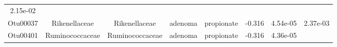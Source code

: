 \documentclass[11pt,]{article}
\begin{document}
\begin{longtable}[]{@{}cccccccc@{}}
\begin{minipage}[t]{0.08\columnwidth}
2.15e-02\strut
\end{minipage}\tabularnewline
\begin{minipage}[t]{0.08\columnwidth}\centering\strut
Otu00037\strut
\end{minipage} & \begin{minipage}[t]{0.15\columnwidth}\centering\strut
Rikenellaceae\strut
\end{minipage} & \begin{minipage}[t]{0.15\columnwidth}\centering\strut
Rikenellaceae\strut
\end{minipage} & \begin{minipage}[t]{0.08\columnwidth}\centering\strut
adenoma\strut
\end{minipage} & \begin{minipage}[t]{0.09\columnwidth}\centering\strut
propionate\strut
\end{minipage} & \begin{minipage}[t]{0.07\columnwidth}\centering\strut
-0.316\strut
\end{minipage} & \begin{minipage}[t]{0.08\columnwidth}\centering\strut
4.54e-05\strut
\end{minipage} & \begin{minipage}[t]{0.08\columnwidth}\centering\strut
2.37e-03\strut
\end{minipage}\tabularnewline
\begin{minipage}[t]{0.08\columnwidth}\centering\strut
Otu00401\strut
\end{minipage} & \begin{minipage}[t]{0.15\columnwidth}\centering\strut
Ruminococcaceae\strut
\end{minipage} & \begin{minipage}[t]{0.15\columnwidth}\centering\strut
Ruminococcaceae\strut
\end{minipage} & \begin{minipage}[t]{0.08\columnwidth}\centering\strut
adenoma\strut
\end{minipage} & \begin{minipage}[t]{0.09\columnwidth}\centering\strut
propionate\strut
\end{minipage} & \begin{minipage}[t]{0.07\columnwidth}\centering\strut
-0.316\strut
\end{minipage} & \begin{minipage}[t]{0.08\columnwidth}\centering\strut
4.36e-05\strut
\end{minipage} & \begin{minipage}[t]{0.08\columnwidth}\centering\strut

\end{minipage}
\end{longtable}
\end{document}
